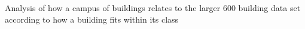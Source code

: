 Analysis of how a campus of buildings relates to the larger 600 building data set according to how a building fits within its class
\label{fig:campuspercentile}